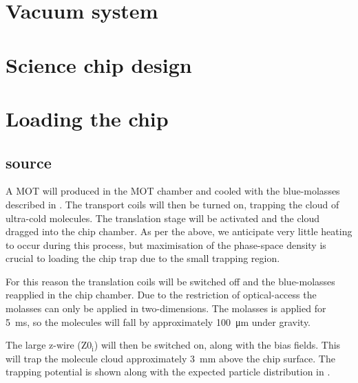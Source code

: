 \section{Vacuum system}


\section{Science chip design}

\section{Loading the chip}

\subsection{\CaF{} source}

A \CaF{} MOT will produced in the MOT chamber and cooled with the blue-molasses
described in . The transport coils will then be turned
on, trapping the cloud of ultra-cold molecules. The translation stage will be
activated and the cloud dragged into the chip chamber.  As per the above, we
anticipate very little heating to occur during this process, but maximisation
of the phase-space density is crucial to loading the chip trap due to the small
trapping region.

For this reason the translation coils will be switched off and the
blue-molasses reapplied in the chip chamber. Due to the restriction of
optical-access the molasses can only be applied in two-dimensions. The molasses
is applied for \SI{5}{\milli\second}, so the molecules will fall by
approximately \SI{100}{\micro\meter} under gravity.

The large z-wire ($\mathrm{Z0_i}$) will then be switched on, along with the
bias fields. This will trap the molecule cloud approximately
\SI{3}{\milli\meter} above the chip surface. The trapping potential is shown
along with the expected particle distribution in .

\begin{figure}[h]
\centering
  \caption{}
  \label{design:fig:bigz}
\end{figure}


